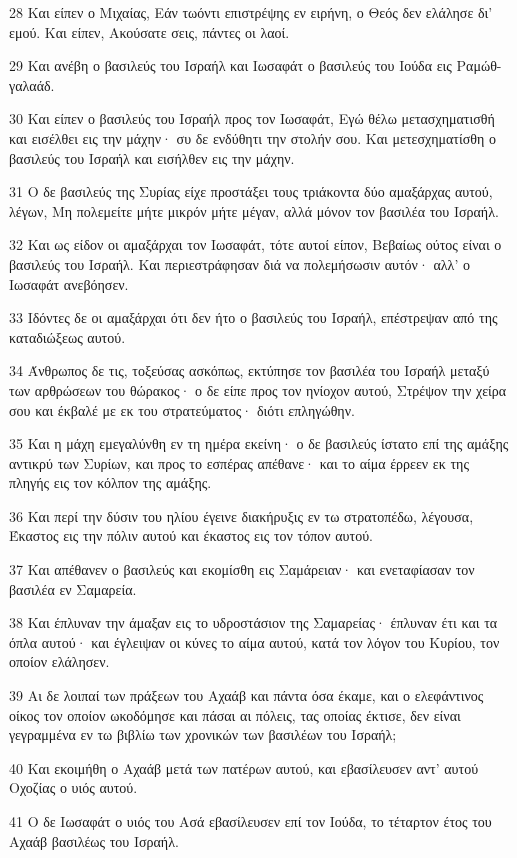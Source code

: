 \par 28 Και είπεν ο Μιχαίας, Εάν τωόντι επιστρέψης εν ειρήνη, ο Θεός δεν ελάλησε δι' εμού. Και είπεν, Ακούσατε σεις, πάντες οι λαοί.
\par 29 Και ανέβη ο βασιλεύς του Ισραήλ και Ιωσαφάτ ο βασιλεύς του Ιούδα εις Ραμώθ-γαλαάδ.
\par 30 Και είπεν ο βασιλεύς του Ισραήλ προς τον Ιωσαφάτ, Εγώ θέλω μετασχηματισθή και εισέλθει εις την μάχην· συ δε ενδύθητι την στολήν σου. Και μετεσχηματίσθη ο βασιλεύς του Ισραήλ και εισήλθεν εις την μάχην.
\par 31 Ο δε βασιλεύς της Συρίας είχε προστάξει τους τριάκοντα δύο αμαξάρχας αυτού, λέγων, Μη πολεμείτε μήτε μικρόν μήτε μέγαν, αλλά μόνον τον βασιλέα του Ισραήλ.
\par 32 Και ως είδον οι αμαξάρχαι τον Ιωσαφάτ, τότε αυτοί είπον, Βεβαίως ούτος είναι ο βασιλεύς του Ισραήλ. Και περιεστράφησαν διά να πολεμήσωσιν αυτόν· αλλ' ο Ιωσαφάτ ανεβόησεν.
\par 33 Ιδόντες δε οι αμαξάρχαι ότι δεν ήτο ο βασιλεύς του Ισραήλ, επέστρεψαν από της καταδιώξεως αυτού.
\par 34 Άνθρωπος δε τις, τοξεύσας ασκόπως, εκτύπησε τον βασιλέα του Ισραήλ μεταξύ των αρθρώσεων του θώρακος· ο δε είπε προς τον ηνίοχον αυτού, Στρέψον την χείρα σου και έκβαλέ με εκ του στρατεύματος· διότι επληγώθην.
\par 35 Και η μάχη εμεγαλύνθη εν τη ημέρα εκείνη· ο δε βασιλεύς ίστατο επί της αμάξης αντικρύ των Συρίων, και προς το εσπέρας απέθανε· και το αίμα έρρεεν εκ της πληγής εις τον κόλπον της αμάξης.
\par 36 Και περί την δύσιν του ηλίου έγεινε διακήρυξις εν τω στρατοπέδω, λέγουσα, Έκαστος εις την πόλιν αυτού και έκαστος εις τον τόπον αυτού.
\par 37 Και απέθανεν ο βασιλεύς και εκομίσθη εις Σαμάρειαν· και ενεταφίασαν τον βασιλέα εν Σαμαρεία.
\par 38 Και έπλυναν την άμαξαν εις το υδροστάσιον της Σαμαρείας· έπλυναν έτι και τα όπλα αυτού· και έγλειψαν οι κύνες το αίμα αυτού, κατά τον λόγον του Κυρίου, τον οποίον ελάλησεν.
\par 39 Αι δε λοιπαί των πράξεων του Αχαάβ και πάντα όσα έκαμε, και ο ελεφάντινος οίκος τον οποίον ωκοδόμησε και πάσαι αι πόλεις, τας οποίας έκτισε, δεν είναι γεγραμμένα εν τω βιβλίω των χρονικών των βασιλέων του Ισραήλ;
\par 40 Και εκοιμήθη ο Αχαάβ μετά των πατέρων αυτού, και εβασίλευσεν αντ' αυτού Οχοζίας ο υιός αυτού.
\par 41 Ο δε Ιωσαφάτ ο υιός του Ασά εβασίλευσεν επί τον Ιούδα, το τέταρτον έτος του Αχαάβ βασιλέως του Ισραήλ.
